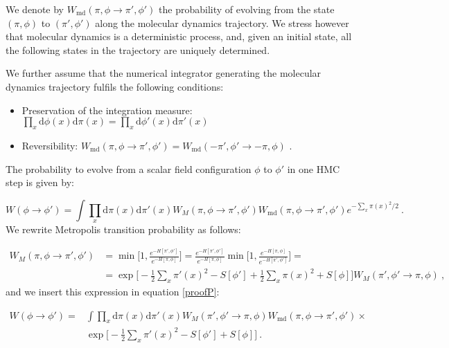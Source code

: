 We denote by $W_{\mathrm{md}}(\pi,\phi \to \pi',\phi')$ the probability of evolving from the state $(\pi,\phi)$ to $(\pi',\phi')$ along the molecular dynamics trajectory.  We stress however that molecular dynamics is a deterministic process, and, given an initial state, all the following states in the trajectory are uniquely determined.

We further assume that the numerical integrator generating the molecular dynamics trajectory fulfils the following conditions:

\begin{itemize}
\item Preservation of the integration measure: $ \prod_{x} \mathrm{d} \phi(x) \mathrm{d} \pi(x) =  \prod_{x} \mathrm{d} \phi'(x) \mathrm{d} \pi'(x)$
\item Reversibility: $W_{\mathrm{md}}(\pi,\phi \to \pi',\phi') = W_{\mathrm{md}}(-\pi',\phi' \to -\pi,\phi )$\: .
\end{itemize}


The probability to evolve from a scalar field configuration $\phi$ to $\phi'$ in one HMC step is given by:

\begin{equation}
W(\phi \to \phi') = \int \prod_{x} \mathrm{d} \pi(x) \mathrm{d} \pi'(x)  W_M(\pi,\phi \to \pi',\phi') W_{\mathrm{md}}(\pi,\phi \to \pi',\phi') e^{-\sum_x \pi(x)^2 /2} \: .
\label{proofP}
\end{equation}
%
We rewrite Metropolis transition probability as follows:

\begin{equation}
\begin{split}
W_M(\pi,\phi \to \pi',\phi') & = \min \biggl[ 1, \frac{e^{-H[\pi',\phi']}}{e^{-H[\pi,\phi]}} \biggr] = 
 \frac{e^{-H[\pi',\phi']}}{e^{-H[\pi,\phi]}} \min \biggl[ 1, \frac{e^{-H[\pi,\phi]}}{e^{-H[\pi',\phi']}} \biggr]  = \\
& = \exp \biggl[ - \frac{1}{2} \sum_x \pi'(x)^2 - S[\phi'] +  \frac{1}{2} \sum_x \pi(x)^2 + S[\phi] \biggr]  W_M(\pi',\phi' \to \pi,\phi) \: ,
\end{split}
\end{equation}
%
and we insert this expression in equation \ref{proofP}:

\begin{equation}
\begin{split}
W(\phi \to \phi') = & \int \prod_{x} \mathrm{d} \pi(x) \mathrm{d} \pi'(x) W_M(\pi',\phi' \to \pi,\phi)  W_{\mathrm{md}}(\pi,\phi \to \pi',\phi') \times \\
&  \exp \biggl[- \frac{1}{2} \sum_x \pi'(x)^2 - S[\phi'] + S[\phi] \biggr]  \:  .  
\end{split}
\end{equation}

